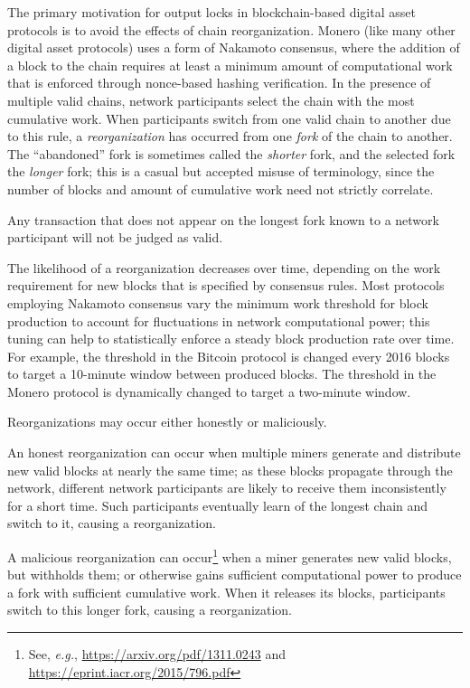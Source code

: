 \documentclass{article}
\theoremstyle{definition}
\begin{document}
The primary motivation for output locks in blockchain-based digital asset protocols is to avoid the effects of chain reorganization.
Monero (like many other digital asset protocols) uses a form of Nakamoto consensus, where the addition of a block to the chain requires at least a minimum amount of computational work that is enforced through nonce-based hashing verification.
In the presence of multiple valid chains, network participants select the chain with the most cumulative work.
When participants switch from one valid chain to another due to this rule, a \textit{reorganization} has occurred from one \textit{fork} of the chain to another.
The ``abandoned'' fork is sometimes called the \textit{shorter} fork, and the selected fork the \textit{longer} fork; this is a casual but accepted misuse of terminology, since the number of blocks and amount of cumulative work need not strictly correlate.

Any transaction that does not appear on the longest fork known to a network participant will not be judged as valid.

The likelihood of a reorganization decreases over time, depending on the work requirement for new blocks that is specified by consensus rules.
Most protocols employing Nakamoto consensus vary the minimum work threshold for block production to account for fluctuations in network computational power; this tuning can help to statistically enforce a steady block production rate over time.
For example, the threshold in the Bitcoin protocol is changed every 2016 blocks to target a 10-minute window between produced blocks.
The threshold in the Monero protocol is dynamically changed to target a two-minute window.

Reorganizations may occur either honestly or maliciously.

An honest reorganization can occur when multiple miners generate and distribute new valid blocks at nearly the same time; as these blocks propagate through the network, different network participants are likely to receive them inconsistently for a short time.
Such participants eventually learn of the longest chain and switch to it, causing a reorganization.

A malicious reorganization can occur\footnote{See, \textit{e.g.}, \url{https://arxiv.org/pdf/1311.0243} and \url{https://eprint.iacr.org/2015/796.pdf}} when a miner generates new valid blocks, but withholds them; or otherwise gains sufficient computational power to produce a fork with sufficient cumulative work.
When it releases its blocks, participants switch to this longer fork, causing a reorganization.
\end{document}
